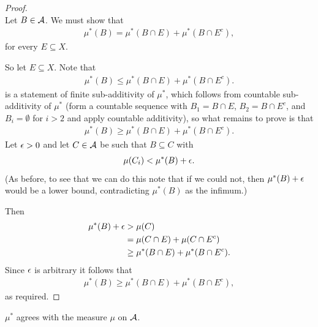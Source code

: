 \begin{proof}~\\
  Let $B \in \mathcal A$. We must show that
  \begin{align*}
    \mu^*(B) = \mu^*(B \cap E) + \mu^*(B \cap E^c),
  \end{align*}
  for every $E \subseteq X$.

  So let $E \subseteq X$. Note that
  \begin{align*}
    \mu^*(B) \leq \mu^*(B \cap E) + \mu^*(B \cap E^c).
  \end{align*}
  is a statement of finite sub-additivity of $\mu^*$, which follows from countable sub-additivity of $\mu^*$
  (form a countable sequence with $B_1 = B \cap E$, $B_2 = B \cap E^c$, and $B_i = \emptyset$ for $i > 2$ and
  apply countable additivity), so what remains to prove is that
  \begin{align*}
    \mu^*(B) \geq \mu^*(B \cap E) + \mu^*(B \cap E^c).
  \end{align*}
  Let $\epsilon > 0$ and let $C \in \mathcal A$ be such that $B \subseteq C$ with
  \begin{align*}
    \mu(C_i) < \mu^*(B) + \epsilon.
  \end{align*}
  (As before, to see that we can do this note that if we could not, then $\mu^*(B) + \epsilon$ would be a lower
  bound, contradicting $\mu^*(B)$ as the infimum.)

  Then
  \begin{align*}
    \mu^*(B) + \epsilon
    &> \mu(C) \\
    &= \mu(C \cap E) + \mu(C \cap E^c) \\
    &\geq \mu^*(B \cap E) + \mu^*(B \cap E^c).
  \end{align*}
  Since $\epsilon$ is arbitrary it follows that
  \begin{align*}
    \mu^*(B) \geq \mu^*(B \cap E) + \mu^*(B \cap E^c),
  \end{align*}
  as required.
\end{proof}
















\begin{claim*}
  $\mu^*$ agrees with the measure $\mu$ on $\mathcal A$.
\end{claim*}

